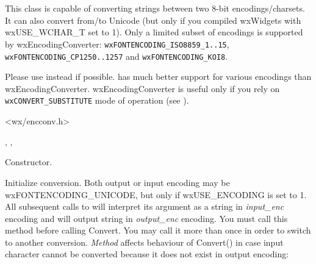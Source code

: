 %
%

\section{}\label{wxencodingconverter}

This class is capable of converting strings between two
8-bit encodings/charsets. It can also convert from/to Unicode (but only
if you compiled wxWidgets with wxUSE\_WCHAR\_T set to 1). Only a limited subset
of encodings is supported by wxEncodingConverter:
{\tt wxFONTENCODING\_ISO8859\_1..15}, {\tt wxFONTENCODING\_CP1250..1257} and 
{\tt wxFONTENCODING\_KOI8}.


Please use  instead
if possible.  has much better support for various
encodings than wxEncodingConverter. wxEncodingConverter is useful only
if you rely on {\tt wxCONVERT\_SUBSTITUTE} mode of operation (see 
).




<wx/encconv.h>




, 
, 




\label{wxencodingconverterwxencodingconverter}


Constructor.


\label{wxencodingconverterinit}


Initialize conversion. Both output or input encoding may
be wxFONTENCODING\_UNICODE, but only if wxUSE\_ENCODING is set to 1.
All subsequent calls to  
will interpret its argument
as a string in {\it input\_enc} encoding and will output string in 
{\it output\_enc} encoding.
You must call this method before calling Convert. You may call 
it more than once in order to switch to another conversion.
{\it Method} affects behaviour of Convert() in case input character
cannot be converted because it does not exist in output encoding:

